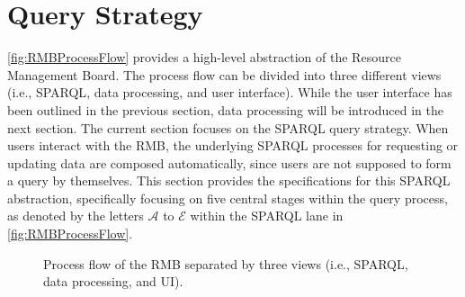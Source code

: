 \section{Query Strategy}\label{sec:QueryStrategy}

\autoref{fig:RMBProcessFlow} provides a high-level abstraction of the Resource Management Board. The process flow can be divided into three different views (i.e., \acrshort*{SPARQL}, data processing, and user interface). While the user interface has been outlined in the previous section, data processing will be introduced in the next section. The current section focuses on the \acrshort*{SPARQL} query strategy. When users interact with the \acrshort*{RMB}, the underlying \acrshort*{SPARQL} processes for requesting or updating data are composed automatically, since users are not supposed to form a query by themselves. This section provides the specifications for this \acrshort*{SPARQL} abstraction, specifically focusing on five central stages within the query process, as denoted by the letters {\small \hyperref[ssec:QS-A]{\(\mathcal{A}\)}} to {\small \hyperref[ssec:QS-E]{\(\mathcal{E}\)}} within the \acrshort*{SPARQL} lane in \autoref{fig:RMBProcessFlow}. 

\begin{figure}[H]
	\centering {}
	\caption[Process Flow of the ]{Process flow of the \acrshort*{RMB} separated by three views (i.e., \acrshort*{SPARQL}, data processing, and \acrshort*{UI}).}
	\label{fig:RMBProcessFlow}
\end{figure}

